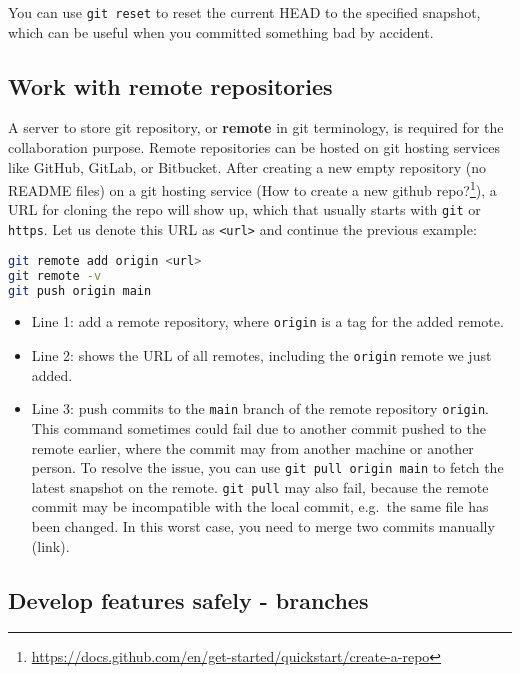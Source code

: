 \documentclass[
  notoc %
]{tufte-book}
\DeclareRobustCommand{\href}[2]{#2\footnote{\url{#1}}}
\providecommand{\tightlist}{%
  \setlength{\itemsep}{0pt}\setlength{\parskip}{0pt}
}
\newcommand{\passthrough}[1]{#1}
\begin{document}
You can use \passthrough{\lstinline!git reset!} to reset the current
HEAD to the specified snapshot, which can be useful when you committed
something bad by accident.

\hypertarget{work-with-remote-repositories}{%
\subsection{Work with remote
repositories}\label{work-with-remote-repositories}}

A server to store git repository, or \textbf{remote} in git terminology,
is required for the collaboration purpose. Remote repositories can be
hosted on git hosting services like GitHub, GitLab, or Bitbucket. After
creating a new empty repository (no README files) on a git hosting
service
(\href{https://docs.github.com/en/get-started/quickstart/create-a-repo}{How
to create a new github repo?}), a URL for cloning the repo will show up,
which that usually starts with \passthrough{\lstinline!git!} or
\passthrough{\lstinline!https!}. Let us denote this URL as
\passthrough{\lstinline!<url>!} and continue the previous example:

\begin{lstlisting}[language=bash]
git remote add origin <url>
git remote -v
git push origin main
\end{lstlisting}

\begin{itemize}
\tightlist
\item
  Line 1: add a remote repository, where
  \passthrough{\lstinline!origin!} is a tag for the added remote.
\item
  Line 2: shows the URL of all remotes, including the
  \passthrough{\lstinline!origin!} remote we just added.
\item
  Line 3: push commits to the \passthrough{\lstinline!main!} branch of
  the remote repository \passthrough{\lstinline!origin!}. This command
  sometimes could fail due to another commit pushed to the remote
  earlier, where the commit may from another machine or another person.
  To resolve the issue, you can use
  \passthrough{\lstinline!git pull origin main!} to fetch the latest
  snapshot on the remote. \passthrough{\lstinline!git pull!} may also
  fail, because the remote commit may be incompatible with the local
  commit, e.g.~the same file has been changed. In this worst case, you
  need to merge two commits manually (link).
\end{itemize}

\hypertarget{develop-features-safely---branches}{%
\subsection{Develop features safely -
branches}\label{develop-features-safely---branches}}
\end{document}
